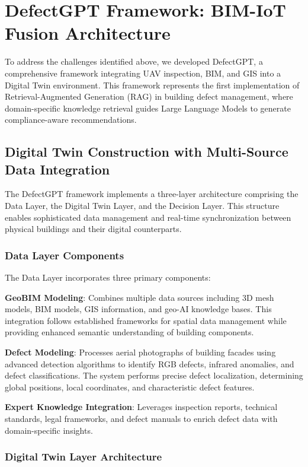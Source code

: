 \section{DefectGPT Framework: BIM-IoT Fusion Architecture}

To address the challenges identified above, we developed DefectGPT, a comprehensive framework integrating UAV inspection, BIM, and GIS into a Digital Twin environment. This framework represents the first implementation of Retrieval-Augmented Generation (RAG) in building defect management, where domain-specific knowledge retrieval guides Large Language Models to generate compliance-aware recommendations.

\subsection{Digital Twin Construction with Multi-Source Data Integration}

The DefectGPT framework implements a three-layer architecture comprising the Data Layer, the Digital Twin Layer, and the Decision Layer. This structure enables sophisticated data management and real-time synchronization between physical buildings and their digital counterparts.

\subsubsection{Data Layer Components}

The Data Layer incorporates three primary components:

\textbf{GeoBIM Modeling}: Combines multiple data sources including 3D mesh models, BIM models, GIS information, and geo-AI knowledge bases. This integration follows established frameworks for spatial data management while providing enhanced semantic understanding of building components.

\textbf{Defect Modeling}: Processes aerial photographs of building facades using advanced detection algorithms to identify RGB defects, infrared anomalies, and defect classifications. The system performs precise defect localization, determining global positions, local coordinates, and characteristic defect features.

\textbf{Expert Knowledge Integration}: Leverages inspection reports, technical standards, legal frameworks, and defect manuals to enrich defect data with domain-specific insights.

\subsubsection{Digital Twin Layer Architecture}

